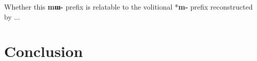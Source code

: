 \documentclass[oneside,a4paper,11pt]{article}
\newcommand{\ipa}[1]{\textbf{{\phon\mbox{#1}}}} %
\begin{document}
Whether this \ipa{mɯ-} prefix is relatable to the volitional *\ipa{m-} prefix reconstructed by \citet[55]{bs14oc}...

\section*{Conclusion}



\end{document}
